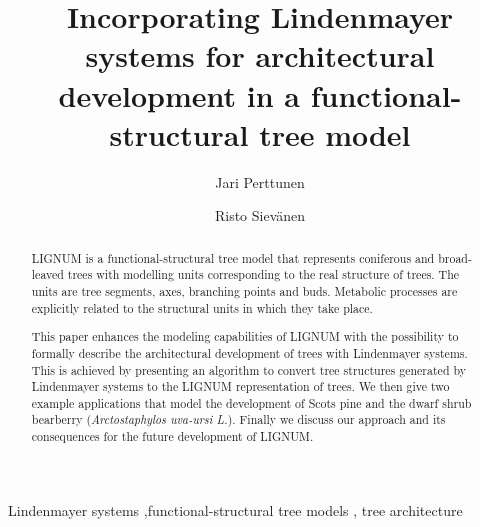 \documentclass[doublespacing]{elsart}
\begin{document}
\begin{frontmatter}


\title{Incorporating Lindenmayer systems for architectural development
in a functional-structural tree model}
\author[Metla]{Jari Perttunen}
\author[Metla]{Risto Siev\"anen}

\address[Metla]{Vantaa   Research  Centre,  Finnish   Forest  Research
Insititute, PL 18,  01301 Vantaa, Finland.}




\begin{abstract}
  LIGNUM  is  a   functional-structural  tree  model  that  represents
  coniferous and broad-leaved trees with modelling units corresponding
  to the real structure of  trees.  The units are tree segments, axes,
  branching  points  and  buds.   Metabolic processes  are  explicitly
  related to the structural units in which they take place.
  
  This  paper enhances the  modeling capabilities  of LIGNUM  with the
  possibility  to formally describe  the architectural  development of
  trees with  Lindenmayer systems. This  is achieved by  presenting an
  algorithm  to  convert  tree  structures  generated  by  Lindenmayer
  systems to  the LIGNUM  representation of trees.   We then  give two
  example applications  that model the  development of Scots  pine and
  the  dwarf shrub  bearberry  (\textit{Arctostaphylos uva-ursi  L.}).
  Finally we discuss our approach  and its consequences for the future
  development of LIGNUM.

\end{abstract}

\begin{keyword}

 Lindenmayer systems \sep functional-structural tree models \sep 
 tree architecture


\end{keyword}

\end{frontmatter}







\end{document}

